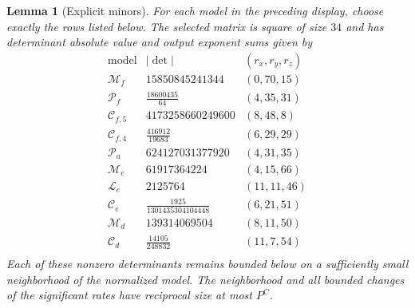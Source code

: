 \documentclass[11pt]{amsart}
\newtheorem{lemma}[theorem]{Lemma}
\theoremstyle{definition}
\theoremstyle{remark}
\numberwithin{equation}{section}
\begin{document}
\begin{lemma}[Explicit minors]\label{low:4:rr:minor_lemma}
For each model in the preceding display, choose exactly the rows listed below. The selected matrix is square of size $34$ and has determinant absolute value and output exponent sums given by
\[
\begin{array}{c|r|c}
\text{model}&|\det|&(r_x,r_y,r_z)\\\hline
\mathcal M_f&15850845241344&(0,70,15)\\
\mathcal P_f&\frac{18600435}{64}&(4,35,31)\\
\mathcal C_{f,5}&4173258660249600&(8,48,8)\\
\mathcal C_{f,4}&\frac{416912}{19683}&(6,29,29)\\
\mathcal P_a&624127031377920&(4,31,35)\\
\mathcal M_e&61917364224&(4,15,66)\\
\mathcal L_e&2125764&(11,11,46)\\
\mathcal C_e&\frac{1925}{1301435304104448}&(6,21,51)\\
\mathcal M_d&139314069504&(8,11,50)\\
\mathcal C_d&\frac{14105}{248832}&(11,7,54)\\
\end{array}
\]
Each of these nonzero determinants remains bounded below on a sufficiently small neighborhood of the normalized model. The neighborhood and all bounded changes of the significant rates have reciprocal size at most $P^C$.
\end{lemma}
\end{document}
